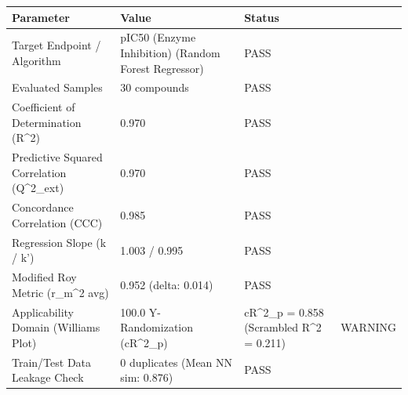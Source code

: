 \begin{tabular}{lll}
\toprule
Parameter & Value & Status \\
\midrule
Target Endpoint / Algorithm & pIC50 (Enzyme Inhibition) (Random Forest Regressor) & PASS \\
Evaluated Samples & 30 compounds & PASS \\
Coefficient of Determination (R^2) & 0.970 & PASS \\
Predictive Squared Correlation (Q^2_ext) & 0.970 & PASS \\
Concordance Correlation (CCC) & 0.985 & PASS \\
Regression Slope (k / k') & 1.003 / 0.995 & PASS \\
Modified Roy Metric (r_m^2 avg) & 0.952 (delta: 0.014) & PASS \\
Applicability Domain (Williams Plot) & 100.0%
Y-Randomization (cR^2_p) & cR^2_p = 0.858 (Scrambled R^2 = 0.211) & WARNING \\
Train/Test Data Leakage Check & 0 duplicates (Mean NN sim: 0.876) & PASS \\
\bottomrule
\end{tabular}

